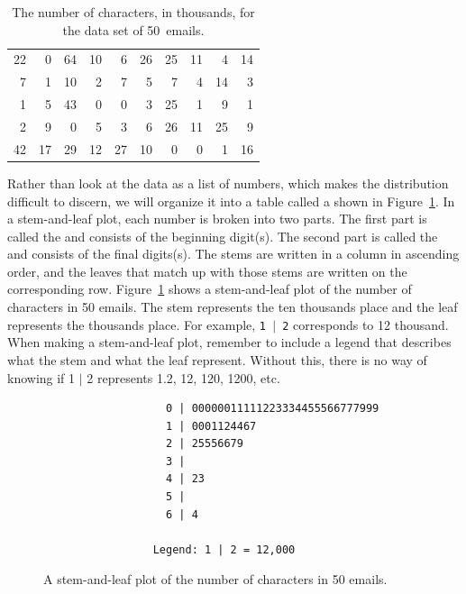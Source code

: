 \textPE{\setlength{\captionwidth}{0.9\textwidth}}

\begin{table}[ht]
\centering
\begin{tabular}{rrrrrrrrrr}
  \hline
 22 & 0 & 64 & 10 & 6 & 26 & 25 & 11 & 4 & 14 \\
  7 & 1 & 10 & 2 & 7 & 5 & 7 & 4 & 14 & 3 \\
   1 & 5 & 43 & 0 & 0 & 3 & 25 & 1 & 9 & 1 \\
  2 & 9 & 0 & 5 & 3 & 6 & 26 & 11 & 25 & 9 \\
  42 & 17 & 29 & 12 & 27 & 10 & 0 & 0 & 1 & 16 \\
   \hline
\end{tabular}
\caption{The number of characters, in thousands, for the data set of 50~emails.}
\end{table}

\textPE{\setlength{\captionwidth}{\mycaptionwidth}}

Rather than look at the data as a list of numbers, which makes the distribution difficult to discern, we will organize it into a table called a  shown in Figure~\ref{stemandleafemail50}. In a stem-and-leaf plot, each number is broken into two parts. The first part is called the  and consists of the beginning digit(s). The second part is called the  and consists of the final digits(s). The stems are written in a column in ascending order, and the leaves that match up with those stems are written on the corresponding row. Figure~\ref{stemandleafemail50} shows a stem-and-leaf plot of the number of characters in 50 emails. The stem represents the ten thousands place and the leaf represents the thousands place. For example, \texttt{1 $|$ 2} corresponds to 12 thousand. When making a stem-and-leaf plot, remember to include a legend that describes what the stem and what the leaf represent. Without this, there is no way of knowing if 1 $|$ 2  represents 1.2, 12, 120, 1200, etc.

\begin{figure}[h]
\begin{verbatim}
                   0 | 00000011111223334455566777999
                   1 | 0001124467
                   2 | 25556679
                   3 |
                   4 | 23
                   5 |
                   6 | 4

                 Legend: 1 | 2 = 12,000
\end{verbatim}
\caption{A stem-and-leaf plot of the number of characters in 50 emails.}
\label{stemandleafemail50}
\end{figure}

